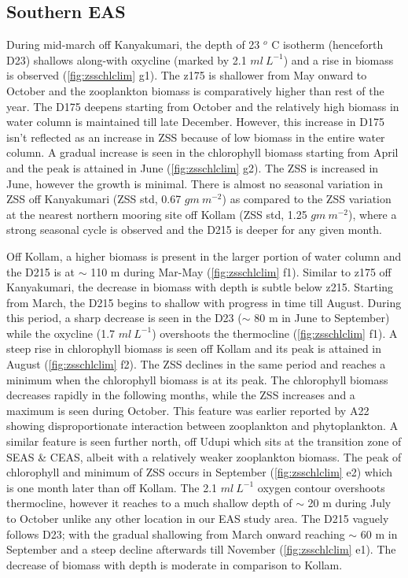 \documentclass{article}
\begin{document}
	\subsection{Southern EAS}
	During mid-march off Kanyakumari, the depth of 23 $^o$ C isotherm (henceforth D23) shallows along-with oxycline (marked by 2.1 $ml \ L^{-1}$) and a rise in biomass is observed (\cref{fig:zsschlclim} g1). The z175 is shallower from May onward to October and the zooplankton biomass is comparatively higher than rest of the year. The D175 deepens starting from October and the relatively high biomass in water column is maintained till late December. However, this increase in D175 isn't reflected as an increase in ZSS because of low biomass in the entire water column. A gradual increase is seen in the chlorophyll biomass starting from April and the peak is attained in June (\cref{fig:zsschlclim} g2). The ZSS is increased in June, however the growth is minimal. There is almost no seasonal variation in ZSS off Kanyakumari (ZSS std, 0.67 $gm\ m^{-2}$) as compared to the ZSS variation at the nearest northern mooring site off Kollam (ZSS std, 1.25 $gm\ m^{-2}$), where a strong seasonal cycle is observed and the D215 is deeper for any given month.
	
	Off Kollam, a higher biomass is present in the larger portion of water column and the D215 is at $\sim$ 110 m during Mar-May (\cref{fig:zsschlclim} f1). Similar to z175 off Kanyakumari, the decrease in biomass with depth is subtle below z215. Starting from March, the D215 begins to shallow with progress in time till August. During this period, a sharp decrease is seen in the D23 ($\sim$ 80 m in June to September) while the oxycline (1.7 $ml \ L^{-1}$) overshoots the thermocline (\cref{fig:zsschlclim} f1). A steep rise in chlorophyll biomass is seen off Kollam and its peak is attained in August (\cref{fig:zsschlclim} f2). The ZSS declines in the same period and reaches a minimum when the chlorophyll biomass is at its peak. The chlorophyll biomass decreases rapidly in the following months, while the ZSS increases and a maximum is seen during October. This feature was earlier reported by A22 showing disproportionate interaction between zooplankton and phytoplankton. A similar feature is seen further north, off Udupi which sits at the transition zone of SEAS \& CEAS, albeit with a relatively weaker zooplankton biomass. The peak of chlorophyll and minimum of ZSS occurs in September (\cref{fig:zsschlclim} e2) which is one month later than off Kollam. The 2.1 $ml \ L^{-1}$  oxygen contour overshoots thermocline, however it reaches to a much shallow depth of $\sim$ 20 m during July to October unlike any other location in our EAS study area. The D215 vaguely follows D23; with the gradual shallowing from March onward reaching $\sim$ 60 m in September and a steep decline afterwards till November (\cref{fig:zsschlclim} e1). The decrease of biomass with depth is moderate in comparison to Kollam.
	
\end{document}
